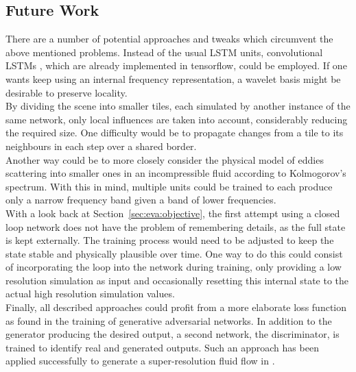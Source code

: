 \documentclass[sigconf]{acmart}
\begin{document}
\subsection{Future Work}
There are a number of potential approaches and tweaks which circumvent the above mentioned problems. Instead of the usual LSTM units, convolutional LSTMs \cite{shi2015convolutional}, which are already implemented in tensorflow, could be employed. If one wants keep using an internal frequency representation, a wavelet basis might be desirable to preserve locality. \\
By dividing the scene into smaller tiles, each simulated by another instance of the same network, only local influences are taken into account, considerably reducing the required size. One difficulty would be to propagate changes from a tile to its neighbours in each step over a shared border.\\
Another way could be to more closely consider the physical model of eddies scattering into smaller ones in an incompressible fluid according to Kolmogorov's spectrum.
With this in mind, multiple units could be trained to each produce only a narrow frequency band given a band of lower frequencies. \\
With a look back at Section~\ref{sec:eva:objective}, the first attempt using a closed loop network does not have the problem of remembering details, as the full state is kept externally. The training process would need to be adjusted to keep the state stable and physically plausible over time. One way to do this could consist of incorporating the loop into the network during training, only providing a low resolution simulation as input and occasionally resetting this internal state to the actual high resolution simulation values.\\
Finally, all described approaches could profit from a more elaborate loss function as found in the training of generative adversarial networks. In addition to the generator producing the desired output, a second network, the discriminator, is trained to identify real and generated outputs. Such an approach has been applied successfully to generate a super-resolution fluid flow in \cite{xingjian2015convolutional}.


%


\appendix
\end{document}
